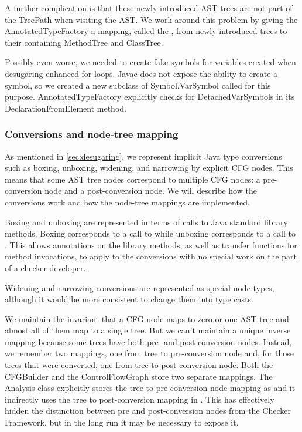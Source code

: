 A further complication is that these newly-introduced AST trees are
not part of the TreePath when visiting the AST.  We work around this
problem by giving the AnnotatedTypeFactory a mapping, called the
, from newly-introduced trees to their containing
MethodTree and ClassTree.

Possibly even worse, we needed to create fake symbols for variables
created when desugaring enhanced for loops.  Javac does not expose the
ability to create a symbol, so we created a new subclass of
Symbol.VarSymbol called  for
this purpose.  AnnotatedTypeFactory explicitly checks for
DetachedVarSymbols in its DeclarationFromElement method.



\subsubsection{Conversions and node-tree mapping}
\label{sec:conversions}

As mentioned in \autoref{sec:desugaring}, we represent implicit Java
type conversions such as boxing, unboxing, widening, and narrowing by
explicit CFG nodes.  This means that some AST tree nodes correspond to
multiple CFG nodes: a pre-conversion node and a post-conversion node.
We will describe how the conversions work and how the node-tree
mappings are implemented.

Boxing and unboxing are represented in terms of calls to Java standard
library methods.  Boxing corresponds to a call to
 while unboxing corresponds to a call to
.  This allows annotations on the library
methods, as well as transfer functions for method invocations, to
apply to the conversions with no special work on the part of a checker
developer.

Widening and narrowing conversions are represented as special
node types, although it would be more consistent to change them into
type casts.

We maintain the invariant that a CFG node maps to zero or one AST tree
and almost all of them map to a single tree.  But we can't maintain a
unique inverse mapping because some trees have both pre- and
post-conversion nodes.  Instead, we remember two mappings, one from
tree to pre-conversion node and, for those trees that were converted,
one from tree to post-conversion node.  Both the CFGBuilder and the
ControlFlowGraph store two separate mappings.  The Analysis class
explicitly stores the tree to pre-conversion node mapping as
 and it indirectly uses the tree to post-conversion
mapping in .  This has effectively
hidden the distinction between pre and post-conversion nodes from the
Checker Framework, but in the long run it may be necessary to expose
it.



